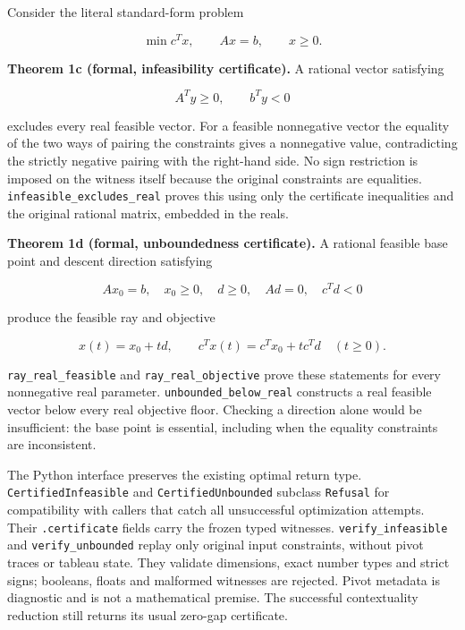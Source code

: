 \documentclass[
  10pt,
]{article}
\begin{document}
Consider the literal standard-form problem

\protect\hypertarget{math-E0036-0016}{}{\[
\min c^T x,\qquad Ax=b,\qquad x\ge0.
\]}

\textbf{Theorem 1c (formal, infeasibility certificate).} A rational vector satisfying

\protect\hypertarget{math-E0037-0017}{}{\[
A^T y\ge0,\qquad b^T y<0
\]}

excludes every real feasible vector. For a feasible nonnegative vector the equality of the two ways of pairing the constraints gives a nonnegative value, contradicting the strictly negative pairing with the right-hand side. No sign restriction is imposed on the witness itself because the original constraints are equalities. \texttt{infeasible\_excludes\_real} proves this using only the certificate inequalities and the original rational matrix, embedded in the reals.

\textbf{Theorem 1d (formal, unboundedness certificate).} A rational feasible base point and descent direction satisfying

\protect\hypertarget{math-E0038-0018}{}{\[
Ax_0=b,\quad x_0\ge0,\quad d\ge0,\quad Ad=0,\quad c^Td<0
\]}

produce the feasible ray and objective

\protect\hypertarget{math-E0039-0019}{}{\[
x(t)=x_0+td,\qquad c^Tx(t)=c^Tx_0+t c^Td\quad(t\ge0).
\]}

\texttt{ray\_real\_feasible} and \texttt{ray\_real\_objective} prove these statements for every nonnegative real parameter. \texttt{unbounded\_below\_real} constructs a real feasible vector below every real objective floor. Checking a direction alone would be insufficient: the base point is essential, including when the equality constraints are inconsistent.

The Python interface preserves the existing optimal return type. \texttt{CertifiedInfeasible} and \texttt{CertifiedUnbounded} subclass \texttt{Refusal} for compatibility with callers that catch all unsuccessful optimization attempts. Their \texttt{.certificate} fields carry the frozen typed witnesses. \texttt{verify\_infeasible} and \texttt{verify\_unbounded} replay only original input constraints, without pivot traces or tableau state. They validate dimensions, exact number types and strict signs; booleans, floats and malformed witnesses are rejected. Pivot metadata is diagnostic and is not a mathematical premise. The successful contextuality reduction still returns its usual zero-gap certificate.
\end{document}
